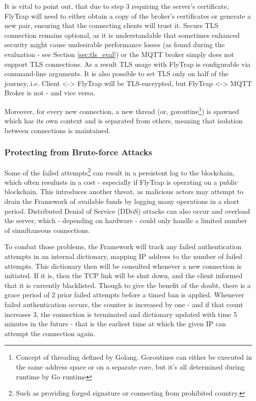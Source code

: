 It is vital to point out, that due to step 3 requiring the server's certificate, FlyTrap will need to either obtain a copy of the broker's certificates or generate a new pair, ensuring that the connecting clients will trust it. Secure TLS connection remains optional, as it is understandable that sometimes enhanced security might cause undesirable performance losses (as found during the evaluation - see Section \ref{sec:tls_eval}) or the MQTT broker simply does not support TLS connections. As a result TLS usage with FlyTrap is configurable via command-line arguments. It is also possible to set TLS only on half of the journey, i.e. Client <-> FlyTrap will be TLS-encrypted, but FlyTrap <-> MQTT Broker is not - and vice versa.

Moreover, for every new connection, a new thread (or, goroutine\footnote{Concept of threading defined by Golang. Goroutines can either be executed in the same address space or on a separate core, but it's all determined during runtime by Go runtime}) is spawned which has its own context and is separated from others, meaning that isolation between connections is maintained.

\subsubsection{Protecting from Brute-force Attacks}\label{sec:ddos}
Some of the failed attempts\footnote{Such as providing forged signature or connecting from prohibited country.} can result in a persistent log to the blockchain, which often resulusts in a cost - especially if FlyTrap is operating on a public blockchain. This introduces another threat, as malicious actors may attempt to drain the Framework of available funds by logging many operations in a short period. Distributed Denial of Service (DDoS) attacks can also occur and overload the server, which - depending on hardware - could only handle a limited number of simultaneous connections.

To combat those problems, the Framework will track any failed authentication attempts in an internal dictionary, mapping IP address to the number of failed attempts. This dictionary then will be consulted whenever a new connection is initiated. If it is, then the TCP link will be shut down, and the client informed that it is currently blacklisted. Though to give the benefit of the doubt, there is a grace period of 2 prior failed attempts before a timed ban is applied. Whenever failed authentication occurs, the counter is increased by one - and if that count increases 3, the connection is terminated and dictionary updated with time 5 minutes in the future - that is the earliest time at which the given IP can attempt the connection again.

